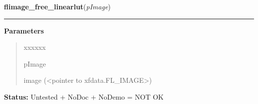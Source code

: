     \label{xformslib:flflimage:flimage_free_linearlut}

    \vspace{0.5ex}

\hspace{.8\funcindent}\begin{boxedminipage}{\funcwidth}

    \raggedright \textbf{flimage\_free\_linearlut}(\textit{pImage})

    \vspace{-1.5ex}

    \rule{\textwidth}{0.5\fboxrule}
\setlength{\parskip}{2ex}
\setlength{\parskip}{1ex}
      \textbf{Parameters}
      \vspace{-1ex}

      \begin{quote}
        \begin{Ventry}{xxxxxx}

          \item[pImage]

          image ({\textless}pointer to xfdata.FL\_IMAGE{\textgreater})

        \end{Ventry}

      \end{quote}

\textbf{Status:} Untested + NoDoc + NoDemo = NOT OK



    \end{boxedminipage}

    \label{xformslib:flflimage:flimage_free_rgb}

    \vspace{0.5ex}

